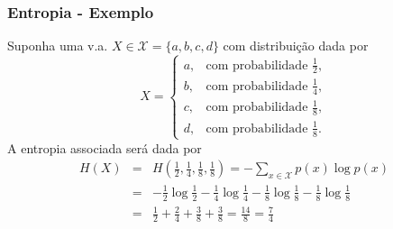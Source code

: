 \begin{frame}%
    \frametitle{Entropia - Exemplo}
  Suponha uma v.a. $X \in \mathcal{X} = \{a,b,c,d\}$ com distribuição dada por  
  \begin{equation}
  X = \begin{cases} a, & \text{com probabilidade } \frac{1}{2}, \\
                b, & \text{com probabilidade } \frac{1}{4}, \\
                c, & \text{com probabilidade } \frac{1}{8}, \\
                d, & \text{com probabilidade } \frac{1}{8}.
      \end{cases}
  \end{equation}
  A entropia associada será dada por
  \begin{eqnarray}
   H(X) &=& H\left(\frac{1}{2},\frac{1}{4},\frac{1}{8},\frac{1}{8}\right) = - \sum_{x \in \mathcal{X}} p(x) \log p(x) \\
        &=& -\frac{1}{2} \log \frac{1}{2} - \frac{1}{4} \log \frac{1}{4} - \frac{1}{8} \log \frac{1}{8} - \frac{1}{8} \log \frac{1}{8} \\
        &=& \frac{1}{2} + \frac{2}{4} + \frac{3}{8} + \frac{3}{8} = \frac{14}{8} = \frac{7}{4} 
  \end{eqnarray}
\end{frame}
